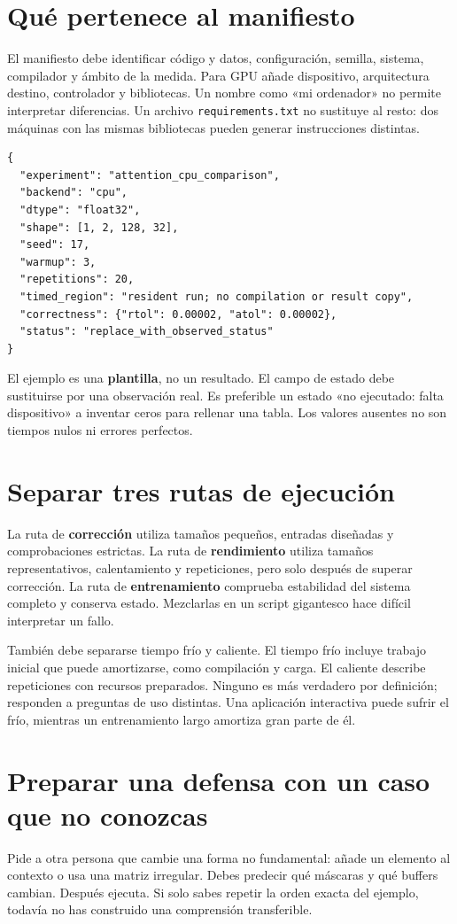 \documentclass[12pt,a4paper,oneside]{report}
\begin{document}
\section{Qué pertenece al manifiesto}
El manifiesto debe identificar código y datos, configuración, semilla, sistema, compilador y ámbito de la medida. Para GPU añade dispositivo, arquitectura destino, controlador y bibliotecas. Un nombre como «mi ordenador» no permite interpretar diferencias. Un archivo \texttt{requirements.txt} no sustituye al resto: dos máquinas con las mismas bibliotecas pueden generar instrucciones distintas.

\begin{lstlisting}
{
  "experiment": "attention_cpu_comparison",
  "backend": "cpu",
  "dtype": "float32",
  "shape": [1, 2, 128, 32],
  "seed": 17,
  "warmup": 3,
  "repetitions": 20,
  "timed_region": "resident run; no compilation or result copy",
  "correctness": {"rtol": 0.00002, "atol": 0.00002},
  "status": "replace_with_observed_status"
}
\end{lstlisting}
El ejemplo es una \textbf{plantilla}, no un resultado. El campo de estado debe sustituirse por una observación real. Es preferible un estado «no ejecutado: falta dispositivo» a inventar ceros para rellenar una tabla. Los valores ausentes no son tiempos nulos ni errores perfectos.

\section{Separar tres rutas de ejecución}
La ruta de \textbf{corrección} utiliza tamaños pequeños, entradas diseñadas y comprobaciones estrictas. La ruta de \textbf{rendimiento} utiliza tamaños representativos, calentamiento y repeticiones, pero solo después de superar corrección. La ruta de \textbf{entrenamiento} comprueba estabilidad del sistema completo y conserva estado. Mezclarlas en un script gigantesco hace difícil interpretar un fallo.

También debe separarse tiempo frío y caliente. El tiempo frío incluye trabajo inicial que puede amortizarse, como compilación y carga. El caliente describe repeticiones con recursos preparados. Ninguno es más verdadero por definición; responden a preguntas de uso distintas. Una aplicación interactiva puede sufrir el frío, mientras un entrenamiento largo amortiza gran parte de él.

\section{Preparar una defensa con un caso que no conozcas}
Pide a otra persona que cambie una forma no fundamental: añade un elemento al contexto o usa una matriz irregular. Debes predecir qué máscaras y qué buffers cambian. Después ejecuta. Si solo sabes repetir la orden exacta del ejemplo, todavía no has construido una comprensión transferible.
\end{document}
